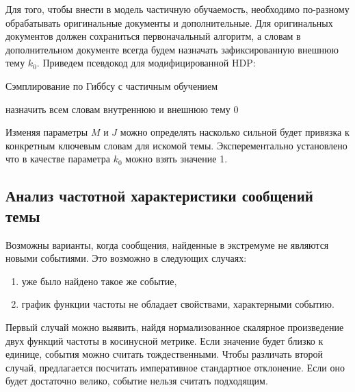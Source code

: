 \documentclass[12pt, a4paper]{article}
\begin{document}
  Для того, чтобы внести в модель частичную обучаемость, необходимо по-разному обрабатывать оригинальные документы и дополнительные. Для оригинальных документов должен сохраниться первоначальный алгоритм, а словам в дополнительном документе всегда будем назначать зафиксированную внешнюю тему $k_0$. Приведем псевдокод для модифицированной HDP:
  
  \begin{algorithm}[H]
  	\caption{Сэмплирование по Гиббсу с частичным обучением}
    \SetAlgoLined
  	назначить всем словам внутреннюю и внешнюю тему $0$\;
  \end{algorithm}
  
  Изменяя параметры $M$ и $J$ можно определять насколько сильной будет привязка к конкретным ключевым словам для искомой темы. Эксперементально установлено что в качестве параметра $k_0$ можно взять значение 1.
  
  \subsection{Анализ частотной характеристики сообщений темы}
  Возможны варианты, когда сообщения, найденные в экстремуме не являются новыми событиями. Это возможно в следующих случаях:
  \begin{enumerate}
  \item уже было найдено такое же событие,
  \item график функции частоты не обладает свойствами, характерными событию.
  \end{enumerate}
  
  Первый случай можно выявить, найдя нормализованное скалярное произведение двух функций частоты в косинусной метрике. Если значение будет близко к единице, события можно считать тождественными. Чтобы различать второй случай, предлагается посчитать императивное стандартное отклонение. Если оно будет достаточно велико, событие нельзя считать подходящим.
  
\end{document}
